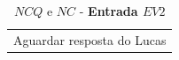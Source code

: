 \begin{table}[htbp]
	\centering
	\caption{$NCQ$ e $NC$ - \textbf{Entrada $EV2$}}
	\begin{tabular}{|c|}
		Aguardar resposta do Lucas
	\end{tabular}
	\label{tab:F3_A2_NCQ_EV2}
\end{table}



